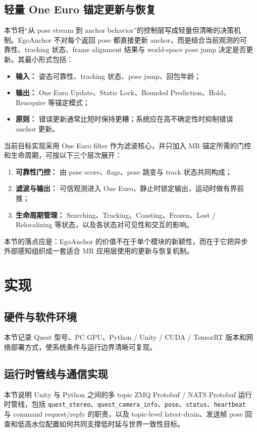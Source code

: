 \documentclass[review]{vgtc}
\begin{document}
\subsection{轻量 One Euro 锚定更新与恢复}
本节将“从 pose stream 到 anchor behavior”的控制层写成轻量但清晰的决策机制。EgoAnchor 不对每个返回 pose 都直接更新 anchor，而是结合当前观测的可靠性、tracking 状态、frame alignment 结果与 world-space pose jump 决定是否更新。其最小形式包括：
\begin{itemize}
  \item \textbf{输入：} 姿态可靠性、tracking 状态、pose jump、回包年龄；
  \item \textbf{输出：} One Euro Update、Static Lock、Bounded Prediction、Hold、Reacquire 等锚定模式；
  \item \textbf{原则：} 错误更新通常比短时保持更糟；系统应在高不确定性时抑制错误 anchor 更新。
\end{itemize}
当前目标实现采用 One Euro filter 作为滤波核心，并只加入 MR 锚定所需的门控和生命周期，可按以下三个层次展开：
\begin{enumerate}
  \item \textbf{可靠性门控：} 由 pose score、flags、pose 跳变与 track 状态共同构成；
  \item \textbf{滤波与输出：} 可信观测进入 One Euro，静止时锁定输出，运动时做有界前推；
  \item \textbf{生命周期管理：} Searching、Tracking、Coasting、Frozen、Lost / Relocalizing 等状态，以及各状态对可见性和交互的影响。
\end{enumerate}
本节的落点应是：EgoAnchor 的价值不在于单个模块的新颖性，而在于它把异步外部感知组织成一套适合 MR 应用层使用的更新与恢复机制。

\section{实现}

\subsection{硬件与软件环境}
本节记录 Quest 型号、PC GPU、Python / Unity / CUDA / TensorRT 版本和网络部署方式，使系统条件与运行边界清晰可复现。

\subsection{运行时管线与通信实现}
本节说明 Unity 与 Python 之间的多 topic ZMQ Protobuf / NATS Protobuf 运行时管线，包括 \texttt{quest\_stereo}、\texttt{quest\_camera\_info}、\texttt{pose}、\texttt{status}、\texttt{heartbeat} 与 command request/reply 的职责，以及 topic-level latest-drain、发送帧 pose 回查和低高水位配置如何共同支撑低时延与世界一致性目标。
\end{document}
